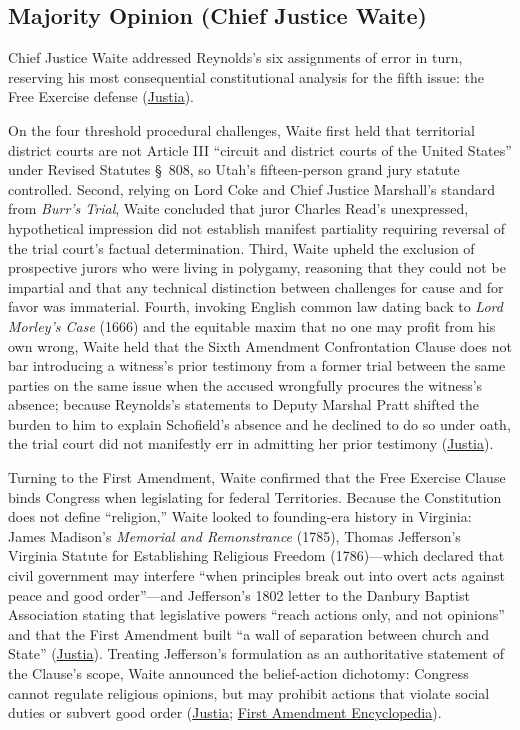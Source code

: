 \documentclass[12pt]{article}
\begin{document}
\subsection{Majority Opinion (Chief Justice Waite)}

Chief Justice Waite addressed Reynolds's six assignments of error in turn, reserving his most consequential constitutional analysis for the fifth issue: the Free Exercise defense (\href{https://supreme.justia.com/cases/federal/us/98/145/}{Justia}).

On the four threshold procedural challenges, Waite first held that territorial district courts are not Article III ``circuit and district courts of the United States'' under Revised Statutes \S~808, so Utah's fifteen-person grand jury statute controlled. Second, relying on Lord Coke and Chief Justice Marshall's standard from \textit{Burr's Trial}, Waite concluded that juror Charles Read's unexpressed, hypothetical impression did not establish manifest partiality requiring reversal of the trial court's factual determination. Third, Waite upheld the exclusion of prospective jurors who were living in polygamy, reasoning that they could not be impartial and that any technical distinction between challenges for cause and for favor was immaterial. Fourth, invoking English common law dating back to \textit{Lord Morley's Case} (1666) and the equitable maxim that no one may profit from his own wrong, Waite held that the Sixth Amendment Confrontation Clause does not bar introducing a witness's prior testimony from a former trial between the same parties on the same issue when the accused wrongfully procures the witness's absence; because Reynolds's statements to Deputy Marshal Pratt shifted the burden to him to explain Schofield's absence and he declined to do so under oath, the trial court did not manifestly err in admitting her prior testimony (\href{https://supreme.justia.com/cases/federal/us/98/145/}{Justia}).

Turning to the First Amendment, Waite confirmed that the Free Exercise Clause binds Congress when legislating for federal Territories. Because the Constitution does not define ``religion,'' Waite looked to founding-era history in Virginia: James Madison's \textit{Memorial and Remonstrance} (1785), Thomas Jefferson's Virginia Statute for Establishing Religious Freedom (1786)---which declared that civil government may interfere ``when principles break out into overt acts against peace and good order''---and Jefferson's 1802 letter to the Danbury Baptist Association stating that legislative powers ``reach actions only, and not opinions'' and that the First Amendment built ``a wall of separation between church and State'' (\href{https://supreme.justia.com/cases/federal/us/98/145/}{Justia}). Treating Jefferson's formulation as an authoritative statement of the Clause's scope, Waite announced the belief-action dichotomy: Congress cannot regulate religious opinions, but may prohibit actions that violate social duties or subvert good order (\href{https://supreme.justia.com/cases/federal/us/98/145/}{Justia}; \href{https://firstamendment.mtsu.edu/article/reynolds-v-united-states/}{First Amendment Encyclopedia}).
\end{document}
